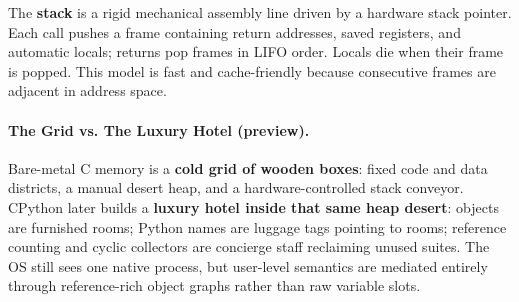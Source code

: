 The \textbf{stack} is a rigid mechanical assembly line driven by a hardware stack pointer. Each call pushes a frame containing return addresses, saved registers, and automatic locals; returns pop frames in LIFO order. Locals die when their frame is popped. This model is fast and cache-friendly because consecutive frames are adjacent in address space.

\paragraph{The Grid vs. The Luxury Hotel (preview).}
Bare-metal C memory is a \textbf{cold grid of wooden boxes}: fixed code and data districts, a manual desert heap, and a hardware-controlled stack conveyor. CPython later builds a \textbf{luxury hotel inside that same heap desert}: objects are furnished rooms; Python names are luggage tags pointing to rooms; reference counting and cyclic collectors are concierge staff reclaiming unused suites. The OS still sees one native process, but user-level semantics are mediated entirely through reference-rich object graphs rather than raw variable slots.

